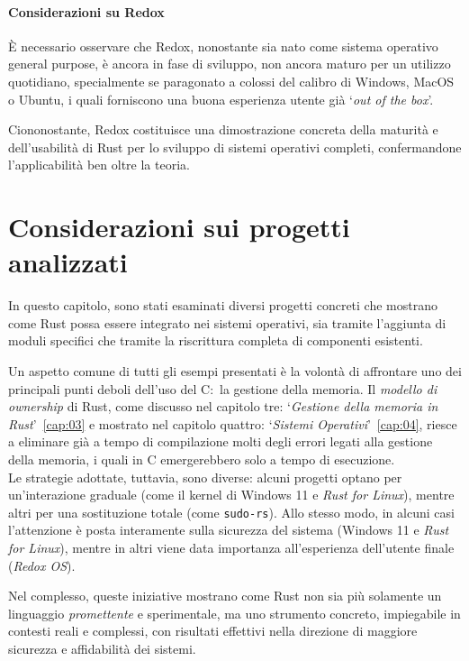 \paragraph{Considerazioni su Redox}
È necessario osservare che Redox, nonostante sia nato come sistema operativo general purpose, è ancora in fase di sviluppo, non ancora 
maturo per un utilizzo quotidiano, specialmente se paragonato a colossi del calibro di Windows, MacOS o Ubuntu, i quali forniscono una buona esperienza utente già `\textit{out of the box}'.

Ciononostante, Redox costituisce una dimostrazione concreta della maturità e dell'usabilità di Rust per lo sviluppo di sistemi operativi completi, confermandone
l'applicabilità ben oltre la teoria.

\section{Considerazioni sui progetti analizzati}
In questo capitolo, sono stati esaminati diversi progetti concreti 
che mostrano come Rust possa essere integrato nei sistemi operativi, sia 
tramite l'aggiunta di moduli specifici che tramite la riscrittura completa di 
componenti esistenti.

Un aspetto comune di tutti gli esempi presentati è la volontà di affrontare uno dei 
principali punti deboli dell'uso del C:\ la gestione della memoria.
Il \textit{modello di ownership} di Rust, come discusso nel capitolo tre: `\textit{Gestione della memoria in Rust}'~\ref{cap:03} 
e mostrato nel capitolo quattro: `\textit{Sistemi Operativi}'~\ref{cap:04}, riesce a 
eliminare già a tempo di compilazione molti degli errori legati alla gestione 
della memoria, i quali in C emergerebbero solo a tempo di esecuzione. \hfill
\vspace{10pt}\\
\noindent Le strategie adottate, tuttavia, sono diverse: alcuni progetti optano 
per un'interazione graduale (come il kernel di Windows 11 e \textit{Rust for Linux}), 
mentre altri per una sostituzione totale (come \texttt{sudo-rs}). 
Allo stesso modo, in alcuni casi l'attenzione è posta interamente sulla 
sicurezza del sistema (Windows 11 e \textit{Rust for Linux}), mentre in altri viene 
data importanza all'esperienza dell'utente finale (\textit{Redox OS}).

Nel complesso, queste iniziative mostrano come Rust non sia più solamente un 
linguaggio \textit{promettente} e sperimentale, ma uno strumento concreto, impiegabile
in contesti reali e complessi, con risultati effettivi nella direzione 
di maggiore sicurezza e affidabilità dei sistemi.